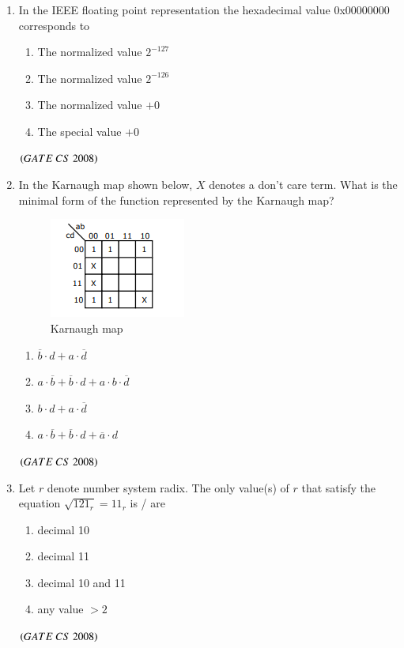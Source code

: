 \documentclass[journal, onecolumn]{IEEEtran}
\numberwithin{equation}{enumi}
\numberwithin{figure}{enumi}
\begin{document}
\begin{enumerate}
\item In the IEEE floating point representation the hexadecimal value 0x00000000 corresponds to
 \vspace{-1em}%
\begin{multicols}{2}
\begin{enumerate}
    \item The normalized value \(2^{-127}\)
    \item The normalized value \(2^{-126}\)
    \item The normalized value \(+0\)
    \item The special value \(+0\)
\end{enumerate}
\end{multicols}
\hfill $\left(GATE\ CS\  2008\right)$

\item In the Karnaugh map shown below, \(X\) denotes a don't care term.  
What is the minimal form of the function represented by the Karnaugh map?
\begin{figure}[H]
    \centering
    \includegraphics[width=0.5\columnwidth]{figs/fig1.png}
    \caption{Karnaugh map}
    \label{fig:1}
   \end{figure}
\begin{multicols}{4}
\begin{enumerate}
    \item \(\overline{b} \cdot d + a \cdot \overline{d}\)
    \item \(a \cdot \overline{b} + \overline{b} \cdot d + a \cdot b \cdot \overline{d}\)
    \item \(b \cdot d + a \cdot \overline{d}\)
    \item \(a \cdot \overline{b} + \overline{b} \cdot d + \overline{a} \cdot d\)
\end{enumerate}
\end{multicols}
\hfill $\left(GATE\ CS\  2008\right)$

\item Let $r$ denote number system radix. The only value(s) of $r$ that satisfy the equation $\sqrt{121_r}= 11_r$ is / are 
\begin{multicols}{2}
\begin{enumerate}
    \item decimal 10
    \item decimal 11
   \item decimal 10 and 11
    \item any value $>2$
\end{enumerate}
\end{multicols}
\hfill $\left(GATE\ CS\  2008\right)$


\end{enumerate}
\end{document}
